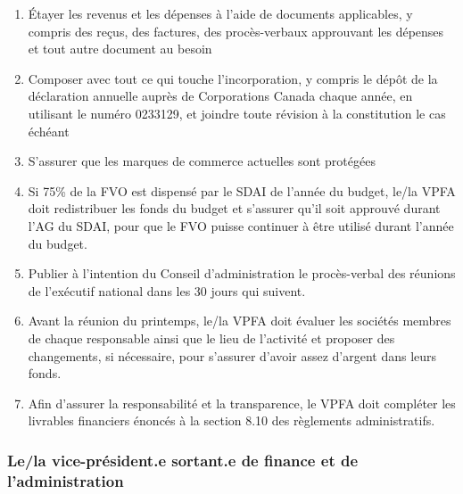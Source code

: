 \begin{enumerate}
\begin{enumerate}
    \begin{enumerate}
     \item
      Offrir des modifications au budget une fois que l'équipes des responsables est établi pour la prochaine année
    \end{enumerate}
   \item
    Étayer les revenus et les dépenses à l'aide de documents applicables, y compris des reçus, des factures, des procès-verbaux approuvant les dépenses et tout autre document au besoin
   \item
    Composer avec tout ce qui touche l'incorporation, y compris le dépôt de la déclaration annuelle auprès de Corporations Canada chaque année, en utilisant le numéro 0233129, et joindre toute révision à la constitution le cas échéant
   \item
    S'assurer que les marques de commerce actuelles sont protégées
   \item
    Si 75\% de la FVO est dispensé par le SDAI de l'année du budget, le/la VPFA doit redistribuer les fonds du budget et s'assurer qu'il soit approuvé durant l'AG du SDAI, pour que le FVO puisse continuer à être utilisé durant l'année du budget.
   \item
    Publier à l'intention du Conseil d'administration le procès-verbal des réunions de l'exécutif national dans les 30 jours qui suivent.
   \item
    Avant la réunion du printemps, le/la VPFA doit évaluer les sociétés membres de chaque responsable ainsi que le lieu de l'activité et proposer des changements, si nécessaire, pour s'assurer d'avoir assez d'argent dans leurs fonds.
   \item
    Afin d'assurer la responsabilité et la transparence, le VPFA doit compléter les livrables financiers énoncés à la section 8.10 des règlements administratifs.
  \end{enumerate}
\end{enumerate}

\subsubsection{Le/la vice-président.e sortant.e de finance et de l'administration}
\label{le-la-vice-president-e-sortant-e-de-finance-et-de-l-administration}

